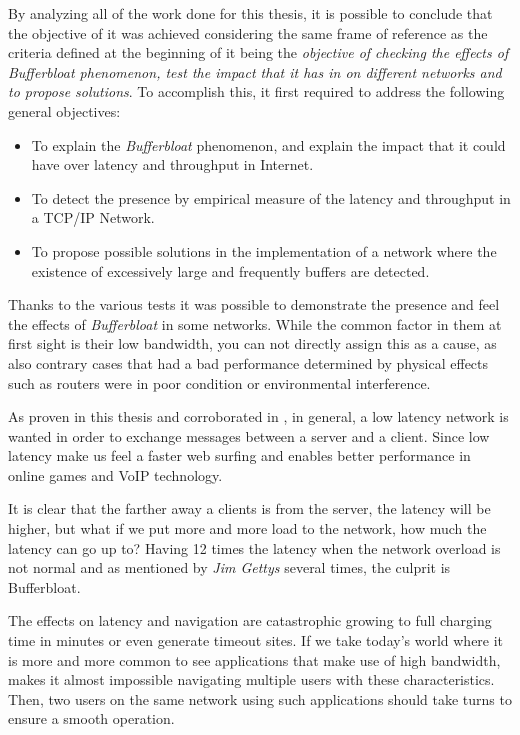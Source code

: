 By analyzing all of the work done for this thesis, it is possible to conclude
that the objective of it was achieved considering the same frame of reference
as the criteria defined at the beginning of it being the \emph{objective of
checking the effects of Bufferbloat phenomenon, test the impact that it has in
on different networks and to propose solutions}. To accomplish
this, it first required to address the following general objectives:

\begin{itemize}
	\item To explain the \emph{Bufferbloat} phenomenon, and explain the impact that it could have over latency and throughput in Internet.
	\item To detect the presence by empirical measure of the latency and throughput in a TCP/IP Network.
	\item To propose possible solutions in the implementation of a network where the existence of excessively large and frequently buffers are detected.
\end{itemize}

Thanks to the various tests it was possible to demonstrate the presence and
feel the effects of \emph{Bufferbloat} in some networks. While the common
factor in them at first sight is their low bandwidth, you can not directly
assign this as a cause, as also contrary cases that had a bad performance
determined by physical effects such as routers were in poor condition or
environmental interference.

As proven in this thesis and corroborated in \cite{MathisMacroCAA}, in
general, a low latency network is wanted in order to exchange  messages between a server and a client. Since low latency make us feel
a faster web surfing and enables better performance in online games and VoIP
technology.

It is clear that the farther away a clients is from the server, the latency
will be higher, but what if we put more and more load to the network, how much
the latency can go up to? Having 12 times the latency when the network
overload is not normal and as mentioned by \emph{Jim Gettys} several times,
the culprit is Bufferbloat.

The effects on latency and navigation are catastrophic growing to full
charging time in minutes or even generate timeout sites.  If we take
today's world where it is more and more common to see applications that make use of
high bandwidth, makes it almost impossible navigating multiple users with these
characteristics. Then, two users on the same network using such applications
should take turns to ensure a smooth operation.

